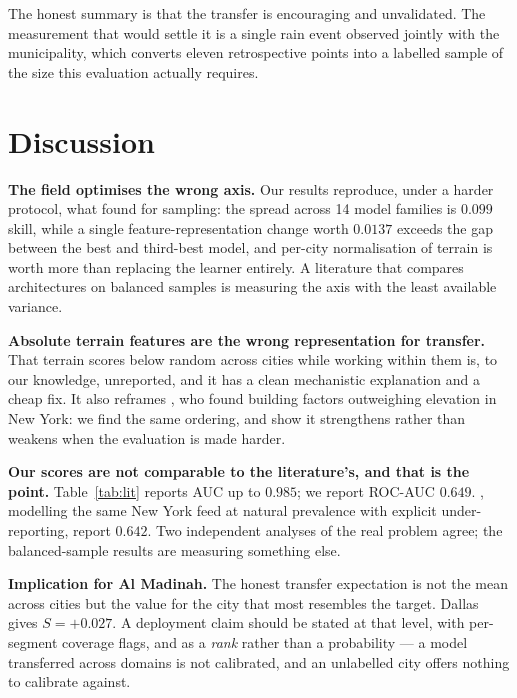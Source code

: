 \documentclass[11pt]{article}
\newcommand{\skl}{\ensuremath{S}}
\begin{document}
The honest summary is that the transfer is encouraging and unvalidated. The
measurement that would settle it is a single rain event observed jointly with
the municipality, which converts eleven retrospective points into a labelled
sample of the size this evaluation actually requires.

\section{Discussion}\label{sec:discussion}

\textbf{The field optimises the wrong axis.} Our results reproduce, under a
harder protocol, what \citet{zhang2025} found for sampling: the spread across
\num{14} model families is $0.099$ skill, while a single feature-representation
change worth $0.0137$ exceeds the gap between the best and third-best model, and
per-city normalisation of terrain is worth more than replacing the learner
entirely. A literature that compares architectures on balanced samples is
measuring the axis with the least available variance.

\textbf{Absolute terrain features are the wrong representation for transfer.}
That terrain scores below random across cities while working within them is, to
our knowledge, unreported, and it has a clean mechanistic explanation and a
cheap fix. It also reframes \citet{agonafir2022ml}, who found building factors
outweighing elevation in New York: we find the same ordering, and show it
strengthens rather than weakens when the evaluation is made harder.

\textbf{Our scores are not comparable to the literature's, and that is the
point.} Table~\ref{tab:lit} reports AUC up to $0.985$; we report ROC-AUC
$0.649$. \citet{agostini2024}, modelling the same New York feed at natural
prevalence with explicit under-reporting, report $0.642$. Two independent
analyses of the real problem agree; the balanced-sample results are measuring
something else.

\textbf{Implication for Al Madinah.} The honest transfer expectation is not the
mean across cities but the value for the city that most resembles the target.
Dallas gives $\skl = +0.027$. A deployment claim should be stated at that level,
with per-segment coverage flags, and as a \emph{rank} rather than a probability
--- a model transferred across domains is not calibrated, and an unlabelled city
offers nothing to calibrate against.

\end{document}

